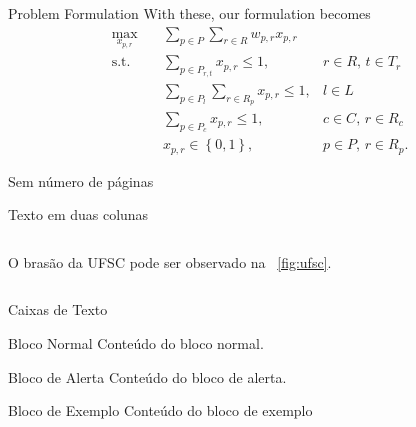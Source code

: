 \documentclass{beamer}
\begin{document}
\begin{frame}{Problem Formulation}
    With these, our formulation becomes
    \begin{align*}
        \max_{x_{p,r}} \quad & \sum_{p \in P} \sum_{r\in R} w_{p,r}x_{p,r} \\
	\textrm{s.t.} \quad & \sum_{p \in P_{r,t}} x_{p,r} \le 1, & r\in R,\,t\in T_r \\
			    & \sum_{p \in P_l} \sum_{r \in R_p} x_{p,r} \le 1, & l \in L \\
			    & \sum_{p \in P_c} x_{p,r} \le 1, & c \in C,\, r \in R_c \\
			    & x_{p,r} \in \left\{ 0,1 \right\}, & p \in P,\, r\in R_p
    .\end{align*}
\end{frame}

\begin{frame}[plain]{Sem número de páginas}
\lipsum[1]
\end{frame}



\begin{frame}{Texto em duas colunas}
  \begin{columns}[c]
    \begin{column}{.5\textwidth}

	O brasão da UFSC pode ser observado na \figurename~\ref{fig:ufsc}.

    \end{column}
    \begin{column}{.5\textwidth}


    \end{column}
  \end{columns}
\end{frame}


\begin{frame}{Caixas de Texto}

\begin{block}{Bloco Normal}
Conteúdo do bloco normal.
\end{block}

\begin{alertblock}{Bloco de Alerta}
Conteúdo do bloco de alerta.
\end{alertblock}

\begin{exampleblock}{Bloco de Exemplo}
Conteúdo do bloco de exemplo
\end{exampleblock}

\end{frame}
\end{document}
